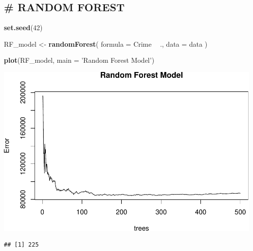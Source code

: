 \documentclass[]{article}
\newenvironment{Shaded}{\begin{snugshade}}{\end{snugshade}}
\newcommand{\KeywordTok}[1]{\textcolor[rgb]{0.13,0.29,0.53}{\textbf{#1}}}
\newcommand{\DataTypeTok}[1]{\textcolor[rgb]{0.13,0.29,0.53}{#1}}
\newcommand{\DecValTok}[1]{\textcolor[rgb]{0.00,0.00,0.81}{#1}}
\newcommand{\StringTok}[1]{\textcolor[rgb]{0.31,0.60,0.02}{#1}}
\newcommand{\CommentTok}[1]{\textcolor[rgb]{0.56,0.35,0.01}{\textit{#1}}}
\newcommand{\OperatorTok}[1]{\textcolor[rgb]{0.81,0.36,0.00}{\textbf{#1}}}
\newcommand{\NormalTok}[1]{#1}
\begin{document}
\subsection{\# RANDOM FOREST}\label{random-forest}

\begin{Shaded}
\begin{Highlighting}[]
\KeywordTok{set.seed}\NormalTok{(}\DecValTok{42}\NormalTok{)}

\NormalTok{RF_model <-}\StringTok{ }\KeywordTok{randomForest}\NormalTok{(}
  \DataTypeTok{formula =}\NormalTok{ Crime }\OperatorTok{~}\StringTok{ }\NormalTok{.,}
  \DataTypeTok{data    =}\NormalTok{ data}
\NormalTok{)}

\KeywordTok{plot}\NormalTok{(RF_model, }\DataTypeTok{main =} \StringTok{'Random Forest Model'}\NormalTok{)}
\end{Highlighting}
\end{Shaded}

\includegraphics{HW7_files/figure-latex/unnamed-chunk-11-1.pdf}

\begin{Shaded}
\end{Shaded}

\begin{verbatim}
## [1] 225
\end{verbatim}

\begin{Shaded}
\end{Shaded}
\end{document}
